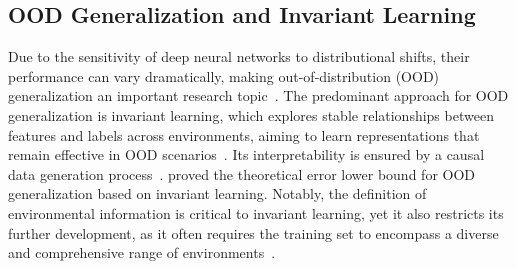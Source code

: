 
\subsection{OOD Generalization and Invariant Learning}Due to the sensitivity of deep neural networks to distributional shifts, their performance can vary dramatically, making out-of-distribution (OOD) generalization an important research topic~\citep{arjovsky2019invariant,li2022out,krueger2021out}. The predominant approach for OOD generalization is invariant learning, which explores stable relationships between features and labels across environments, aiming to learn representations that remain effective in OOD scenarios~\citep{creager2021environment,ahuja2020empirical}. Its interpretability is ensured by a causal data generation process~\citep{sun2020latent}. \citep{ye2021towards} proved the theoretical error lower bound for OOD generalization based on invariant learning. Notably, the definition of environmental information is critical to invariant learning, yet it also restricts its further development, as it often requires the training set to encompass a diverse and comprehensive range of environments~\citep{lin2022zin,rosenfeld2020risks,nagarajan2020understanding}.

